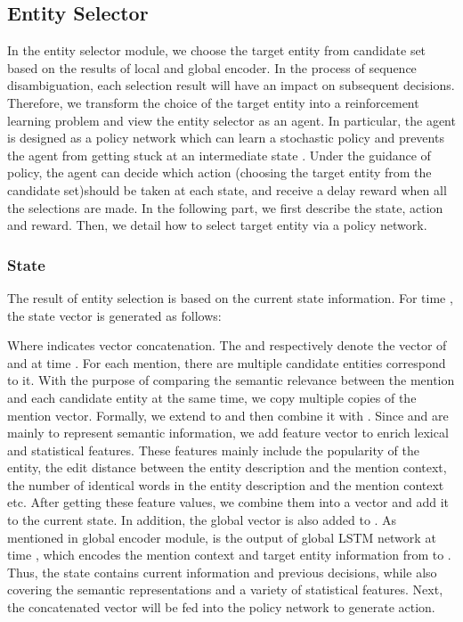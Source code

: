 \documentclass[sigconf]{acmart}
\begin{document}
\subsection{Entity Selector}
In the entity selector module, we choose the target entity from candidate set based on the results of local and global encoder. In the process of sequence disambiguation, each selection result will have an impact on subsequent decisions. Therefore, we transform the choice of the target entity into a reinforcement learning problem and view the entity selector as an agent. In particular, the agent is designed as a policy network which can learn a stochastic policy and prevents the agent from getting stuck at an intermediate state \cite{XiongHW17}. Under the guidance of policy, the agent can decide which action (choosing the target entity from the candidate set)should be taken at each state, and receive a delay reward when all the selections are made. In the following part, we first describe the state, action and reward. Then, we detail how to select target entity via a policy network.

\subsubsection*{State}
The result of entity selection is based on the current state information. For time , the state vector  is generated as follows:

Where  indicates vector concatenation. The  and  respectively denote the vector of  and  at time . For each mention, there are multiple candidate entities correspond to it. With the purpose of comparing the semantic relevance between the mention and each candidate entity at the same time, we copy multiple copies of the mention vector. Formally, we extend  to  and then combine it with . Since  and  are mainly to represent semantic information, we add feature vector  to enrich lexical and statistical features. These features mainly include the popularity of the entity, the edit distance between the entity description and the mention context, the number of identical words in the entity description and the mention context etc. After getting these feature values, we combine them into a vector and add it to the current state. In addition, the global vector  is also added to . As mentioned in global encoder module,  is the output of global LSTM network at time , which encodes the mention context and target entity information from  to . Thus, the state  contains current information and previous decisions, while also covering the semantic representations and a variety of statistical features. Next, the concatenated vector will be fed into the policy network to generate action.
\end{document}
